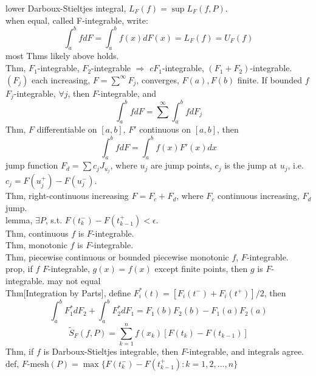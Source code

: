 \documentclass[paper=a4, fontsize=11pt]{scrartcl} %
\numberwithin{equation}{section} %
\numberwithin{figure}{section} %
\numberwithin{table}{section} %
\begin{document}
lower Darboux-Stieltjes integral, $L_F(f) = \sup L_F(f,P)$.\\
when equal, called F-integrable, write:
\begin{equation}
\int_a^b fdF = \int_a^b f(x) dF(x) = L_F(f) = U_F(f)
\end{equation}
most Thms likely above holds.\\
Thm, $F_1$-integrable, $F_2$-integrable $\Rightarrow$ $cF_1$-integrable, $(F_1+F_2)$-integrable.\\
$(F_j)$ each increasing, $F=\sum^\infty F_j$, converges, $F(a),F(b)$ finite. If bounded $f$ $F_j$-integrable, $\forall j$, then $F$-integrable, and
\begin{equation}
\int_a^b fdF = \sum^\infty \int_a^b fdF_j
\end{equation}
Thm, $F$ differentiable on $[a,b]$, $F'$ continuous on $[a,b]$, then
\begin{equation}
\int_a^b fdF = \int_a^b f(x) F'(x) dx
\end{equation}
jump function $F_d = \sum c_j J_{u_j}$, where $u_j$ are jump points, $c_j$ is the jump at $u_j$, i.e. $c_j = F(u_j^+) - F(u_j^-)$.\\
Thm, right-continuous increasing $F=F_c+F_d$, where $F_c$ continuous increasing, $F_d$ jump.\\
lemma, $\exists P$, s.t. $F(t_k^-) - F(t_{k-1}^+)<\epsilon$.\\
Thm, continuous $f$ is $F$-integrable.\\
Thm, monotonic $f$ is $F$-integrable.\\
Thm, piecewise continuous or bounded piecewise monotonic $f$, $F$-integrable.\\
prop, if $f$ $F$-integrable, $g(x)=f(x)$ except finite points, then $g$ is $F$-integrable. may not equal\\
Thm[Integration by Parts], define $F_i^*(t) = [F_i(t^-) + F_i(t^+)]/2$, then
\begin{equation}
\int_a^b F_1^*dF_2 + \int_a^b F_2^*dF_1 = F_1(b)F_2(b) - F_1(a)F_2(a)
\end{equation}
\begin{equation}
\tilde{S}_F(f,P) = \sum_{k=1}^n f(x_k)[F(t_k) - F(t_{k-1})]
\end{equation}
Thm, if $f$ is Darboux-Stieltjes integrable, then $F$-integrable, and integrals agree.\\
def, $F\text{-mesh}(P) = \max \{F(t_k^-) - F(t_{k-1}^+):k=1,2,...,n\}$\\
\end{document}
